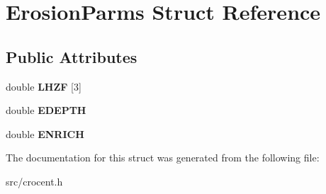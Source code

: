 \hypertarget{struct_erosion_parms}{\section{Erosion\-Parms Struct Reference}
\label{struct_erosion_parms}
}
\subsection*{Public Attributes}
\begin{DoxyCompactItemize}
\item 
\hypertarget{struct_erosion_parms_aa0c3660ac73524c0bfd5786f36a318c2}{double {\bfseries L\-H\-Z\-F} \mbox{[}3\mbox{]}}\label{struct_erosion_parms_aa0c3660ac73524c0bfd5786f36a318c2}

\item 
\hypertarget{struct_erosion_parms_aaf316b00db7854a52307ce41b40d916e}{double {\bfseries E\-D\-E\-P\-T\-H}}\label{struct_erosion_parms_aaf316b00db7854a52307ce41b40d916e}

\item 
\hypertarget{struct_erosion_parms_a1d98e851e39e3649aad7aa27205c27c8}{double {\bfseries E\-N\-R\-I\-C\-H}}\label{struct_erosion_parms_a1d98e851e39e3649aad7aa27205c27c8}

\end{DoxyCompactItemize}


The documentation for this struct was generated from the following file\-:\begin{DoxyCompactItemize}
\item 
src/crocent.\-h\end{DoxyCompactItemize}
